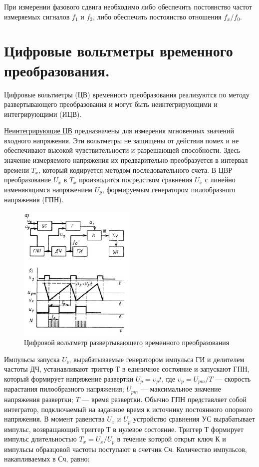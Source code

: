 \documentclass[unicode, 12pt, a4paper, oneside]{article}
\begin{document}
При измерении фазового сдвига необходимо либо обеспечить постоянство частот измеряемых сигналов $f_1$ и $f_2$, либо обеспечить постоянство отношения $f_x/f_0$.

\section{Цифровые вольтметры временного преобразования.}

Цифровые вольтметры (ЦВ) временного преобразования реализуются по методу развертывающего преобразования и могут быть неинтегрирующими и интегрирующими (ИЦВ).

\underline{Неинтегрирующие ЦВ} предназначены для измерения мгновенных значений входного напряжения. Эти вольтметры не защищены от действия помех и не обеспечивают высокой чувствительности и разрешающей способности. Здесь значение измеряемого напряжения их предварительно преобразуется в интервал времени $T_x$, который кодируется методом последовательного счета. В ЦВР преобразование $U_x$ в $T_x$ производится посредством сравнения $U_x$ с линейно изменяющимся напряжением $U_p$, формируемым генератором пилообразного напряжения (ГПН).

\begin{figure}[H]
\centering
\includegraphics[width=0.5\textwidth]{55_1.jpg}
\caption{Цифровой вольтметр развертывающего временного преобразования}
\end{figure}

Импульсы запуска $U_\text{з}$, вырабатываемые генератором импульса ГИ и делителем частоты ДЧ, устанавливают триггер Т в единичное состояние и запускают ГПН, который формирует напряжение развертки $U_p=\upsilon_p t$, где $\upsilon_p =U_{pm}/T$ — скорость нарастания пилообразного напряжения; $U_{pm}$ — максимальное значение напряжения развертки; $T$ — время развертки. Обычно ГПН представляет собой интегратор, подключаемый на заданное время к источнику постоянного опорного напряжения. В момент равенства $U_x$ и $U_p$ устройство сравнения УС вырабатывает импульс, возвращающий триггер Т в нулевое состояние. Триггер Т формирует импульс длительностью $T_x=U_x/U_p$ в течение которой открыт ключ К и импульсы образцовой частоты поступают в счетчик Сч. Количество импульсов, накапливаемых в Сч, равно: 
\end{document}

